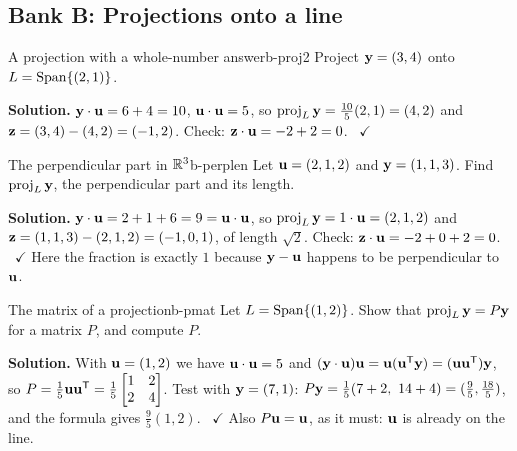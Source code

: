 \documentclass[11pt]{article}
\begin{document}
\subsection*{Bank B: Projections onto a line}
\begin{exmp}{A projection with a whole-number answer}{b-proj2}
Project $\mathbf{y}=(3,4)$ onto $L=\operatorname{Span}\{(2,1)\}$.

\textbf{Solution.} $\mathbf{y}\cdot\mathbf{u}=6+4=10$, $\mathbf{u}\cdot\mathbf{u}=5$, so $\operatorname{proj}_L\mathbf{y}=\tfrac{10}{5}(2,1)=(4,2)$ and $\mathbf{z}=(3,4)-(4,2)=(-1,2)$. Check: $\mathbf{z}\cdot\mathbf{u}=-2+2=0$. \ $\checkmark$
\end{exmp}

\begin{exmp}{The perpendicular part in $\mathbb{R}^3$}{b-perplen}
Let $\mathbf{u}=(2,1,2)$ and $\mathbf{y}=(1,1,3)$. Find $\operatorname{proj}_L\mathbf{y}$, the perpendicular part and its length.

\textbf{Solution.} $\mathbf{y}\cdot\mathbf{u}=2+1+6=9=\mathbf{u}\cdot\mathbf{u}$, so $\operatorname{proj}_L\mathbf{y}=1\cdot\mathbf{u}=(2,1,2)$ and $\mathbf{z}=(1,1,3)-(2,1,2)=(-1,0,1)$, of length $\sqrt2$. Check: $\mathbf{z}\cdot\mathbf{u}=-2+0+2=0$. \ $\checkmark$ Here the fraction is exactly $1$ because $\mathbf{y}-\mathbf{u}$ happens to be perpendicular to $\mathbf{u}$.
\end{exmp}

\begin{exmp}{The matrix of a projection}{b-pmat}
Let $L=\operatorname{Span}\{(1,2)\}$. Show that $\operatorname{proj}_L\mathbf{y}=P\mathbf{y}$ for a matrix $P$, and compute $P$.

\textbf{Solution.} With $\mathbf{u}=(1,2)$ we have $\mathbf{u}\cdot\mathbf{u}=5$ and $(\mathbf{y}\cdot\mathbf{u})\mathbf{u}=\mathbf{u}(\mathbf{u}^{\mathsf T}\mathbf{y})=(\mathbf{u}\mathbf{u}^{\mathsf T})\mathbf{y}$, so $P=\tfrac15\mathbf{u}\mathbf{u}^{\mathsf T}=\tfrac15\begin{bmatrix}1&2\\2&4\end{bmatrix}$. Test with $\mathbf{y}=(7,1)$: $P\bv{y}=\tfrac15(7+2,\ 14+4)=(\tfrac95,\tfrac{18}5)$, and the formula gives $\tfrac{9}{5}(1,2)$. \ $\checkmark$ Also $P\mathbf{u}=\mathbf{u}$, as it must: $\mathbf{u}$ is already on the line.
\end{exmp}
\end{document}
